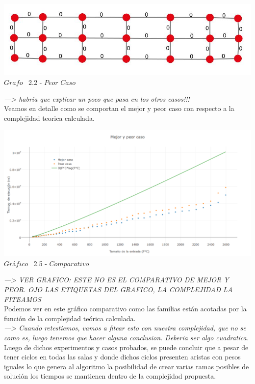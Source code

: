 \vspace*{0.3cm} \vspace*{0.3cm}
  \begin{center}
 \includegraphics[scale=0.5]{./EJ2/ej2grafosinpared.jpeg}
 \\{$Grafo$ \ 2.2 - $Peor$ $Caso$}
  \end{center}
  \vspace*{0.3cm}
  
\textit{---> habria que explicar un poco que pasa en los otros casos!!!}\\
  
Veamos en detalle como se comportan el mejor y peor caso con respecto a la complejidad teorica calculada.\\

\vspace*{0.3cm} \vspace*{0.3cm}
  \begin{center}
\includegraphics[scale=0.35]{./EJ2/MejorYPeorCaso.png}
 {$Gr$\'a$fico$ \ 2.5 - $Comparativo$}
  \end{center}
  \vspace*{0.3cm}
  
\textit{---> VER GRAFICO: ESTE NO ES EL COMPARATIVO DE MEJOR Y PEOR. OJO LAS ETIQUETAS DEL GRAFICO, LA COMPLEJIDAD LA FITEAMOS}\\  
  
Podemos ver en este gr\'afico comparativo como las familias est\'an acotadas por la funci\'on de la complejidad te\'orica calculada.\\

\textit{---> Cuando retestiemos, vamos a fitear esto con nuestra complejidad, que no se como es, luego tenemos que hacer alguna conclusion. Deberia ser algo cuadratica.}\\
  
Luego de dichos experimentos y casos probados, se puede concluir que a pesar de tener ciclos en todas las salas y donde dichos ciclos presenten aristas con pesos iguales lo que genera al algoritmo la posibilidad de crear varias ramas posibles de soluci\'on los tiempos se mantienen dentro de la complejidad propuesta.\\
